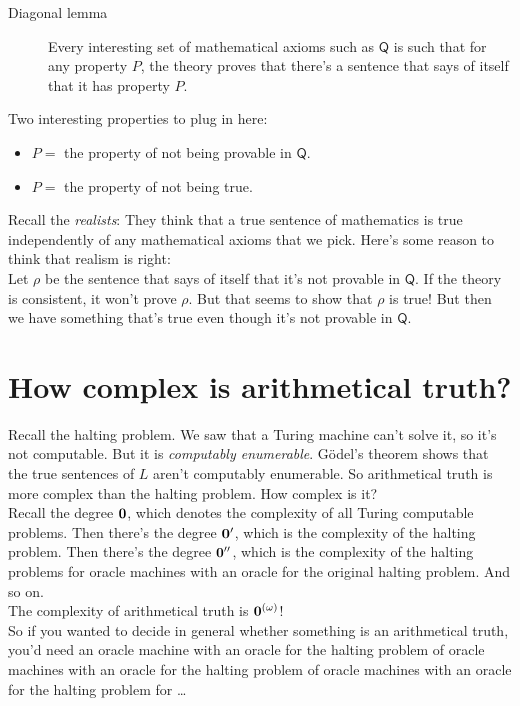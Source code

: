 \documentclass[justified]{tufte-handout}
\begin{document}
\begin{description}
\item[Diagonal lemma] Every interesting set of mathematical axioms such as $\mathsf{Q}$ is such that for any property $P$, the theory proves that there's a sentence that says of itself that it has property $P$.
\end{description}
Two interesting properties to plug in here:

\begin{itemize}
\item $P=$ the property of not being provable in $\mathsf{Q}$.
\item $P=$ the property of not being true.
\end{itemize}

\noindent Recall the \emph{realists}: They think that a true sentence of mathematics is true independently of any mathematical axioms that we pick. Here's some reason to think that realism is right: \\

\noindent Let $\rho$ be the sentence that says of itself that it's not provable in $\mathsf{Q}$. If the theory is consistent, it won't prove $\rho$. But that seems to show that $\rho$ is true! But then we have something that's true even though it's not provable in $\mathsf{Q}$.

\section{How complex is arithmetical truth?}

\noindent Recall the halting problem. We saw that a Turing machine can't solve it, so it's not computable. But it is \emph{computably enumerable}. G\"odel's theorem shows that the true sentences of $L$ aren't computably enumerable. So arithmetical truth is more complex than the halting problem. How complex is it?\\

\noindent Recall the degree ${\bf 0}$, which denotes the complexity of all Turing computable problems. Then there's the degree ${\bf 0'}$, which is the complexity of the halting problem. Then there's the degree ${\bf 0''}$, which is the complexity of the halting problems for oracle machines with an oracle for the original halting problem. And so on.\\

\noindent The complexity of arithmetical truth is ${\bf 0}^{(\omega)}$!\\

\noindent So if you wanted to decide in general whether something is an arithmetical truth, you'd need an oracle machine with an oracle for the halting problem of oracle machines with an oracle for the halting problem of oracle machines with an oracle for the halting problem for \dots
\end{document}
